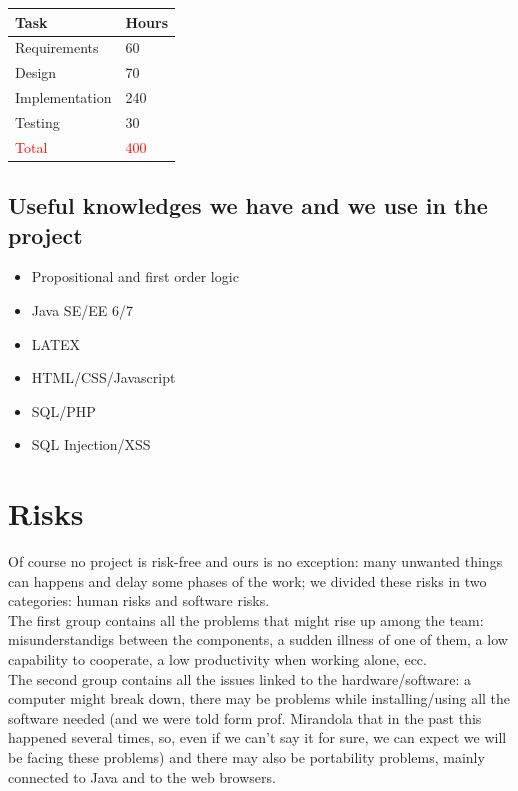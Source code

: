 \documentclass[a4paper,12pt]{article}
\begin{document}
\begin{center}
\setlength\arrayrulewidth{0.5mm}
\begin{tabular}{|l|l|}
\rowcolor[gray]{.8}
\hline \textbf{Task} & \textbf{Hours} \\
\hline Requirements & 60 \\
\hline Design & 70 \\
\hline Implementation & 240 \\
\hline Testing & 30 \\
\hline \textcolor{red}{Total} & \textcolor{red}{400} \\
\hline 
\end{tabular}
\end{center}

\subsection{Useful knowledges we have and we use in the project}
\begin{itemize}
\item Propositional and first order logic
\item Java SE/EE 6/7
\item LATEX
\item HTML/CSS/Javascript
\item SQL/PHP
\item SQL Injection/XSS
\end{itemize}

\clearpage

\section{Risks}
Of course no project is risk-free and ours is no exception: many unwanted things can happens and delay some phases of the work; we divided these risks in two categories: human risks and software risks.\\[1\baselineskip]The first group contains all the problems that might rise up among the team: misunderstandigs between the components, a sudden illness of one of them, a low capability to cooperate, a low productivity when working alone, ecc.\\[1\baselineskip]The second group contains all the issues linked to the hardware/software: a computer might break down, there may be problems while installing/using all the software needed (and we were told form prof. Mirandola that in the past this happened several times, so, even if we can’t say it for sure, we can expect we will be facing these problems) and there may also be portability problems, mainly connected to Java and to the web browsers.\\[1\baselineskip]
\end{document}
